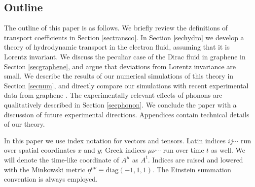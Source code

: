 \documentclass[10pt, oneside]{book}
\begin{document}
\begin{doublespace}
\subsection{Outline}
The outline of this paper is as follows.  We briefly review the definitions of transport coefficients in Section \ref{sectransco}.   In Section \ref{sechydro} we develop a theory of hydrodynamic transport in the electron fluid, assuming that it is Lorentz invariant.  We discuss the peculiar case of the Dirac fluid in graphene in Section \ref{secgraphene}, and argue that deviations from Lorentz invariance are small.   We describe the results of our numerical simulations of this theory in Section \ref{secnum}, and directly compare our simulations with recent experimental data from graphene \cite{Crossno1058}.  The experimentally relevant effects of phonons are qualitatively described in Section \ref{secphonon}.  We conclude the paper with a discussion of future experimental directions.   Appendices contain technical details of our theory.

In this paper we use index notation for vectors and tensors.  Latin indices $ij\cdots$ run over spatial coordinates $x$ and $y$;  Greek indices $\mu\nu\cdots$ run over time $t$ as well.   We will denote the time-like coordinate of $A^\mu$ as $A^t$.  Indices are raised and lowered with the Minkowski metric $\eta^{\mu\nu} \equiv \mathrm{diag}(-1,1,1)$.  The Einstein summation convention is always employed.


\end{doublespace}
\end{document}
